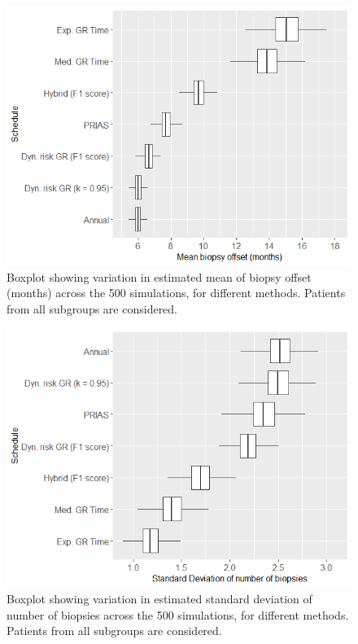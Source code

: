 \begin{figure}[!htb]
\centerline{\includegraphics[width=\columnwidth]{images/sim_study/offsetMeanBoxPlot_all.png}}
\caption{Boxplot showing variation in estimated mean of biopsy offset (months) across the 500 simulations, for different methods. Patients from all subgroups are considered.}
\label{fig : offsetMeanBoxPlot_all}
\end{figure}

\begin{figure}[!htb]
\centerline{\includegraphics[width=\columnwidth]{images/sim_study/nbSDBoxPlot_all.png}}
\caption{Boxplot showing variation in estimated standard deviation of number of biopsies across the 500 simulations, for different methods. Patients from all subgroups are considered.}
\label{fig : nbSDBoxPlot_all}
\end{figure}

